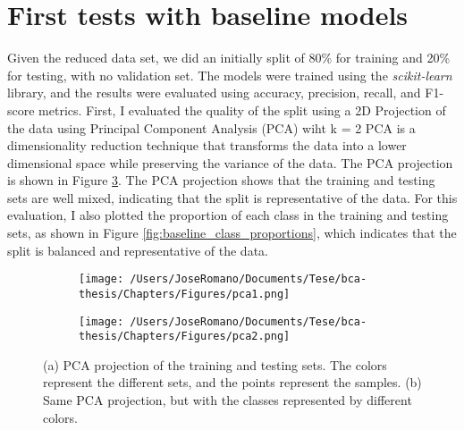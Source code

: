 \section{First tests with baseline models}

Given the reduced data set, we did an initially split of 80\% for training and
20\% for testing, with no validation set. The models were trained using the
\textit{scikit-learn} library, and the results were evaluated using accuracy,
precision, recall, and F1-score metrics. First, I evaluated the quality of the
split using a 2D Projection of the data using Principal Component Analysis
(PCA) wiht k = 2 PCA is a dimensionality reduction technique that transforms
the data into a lower dimensional space while preserving the variance of the
data. The PCA projection is shown in Figure \ref{fig:side_by_side_pca}. The PCA
projection shows that the training and testing sets are well mixed, indicating
that the split is representative of the data. For this evaluation, I also
plotted the proportion of each class in the training and testing sets, as shown
in Figure \ref{fig:baseline_class_proportions}, which indicates that the split
is balanced and representative of the data.

\begin{figure}[ht]
  \centering
  \begin{subfigure}[t]{0.48\textwidth}
    \centering
    \texttt{[image: /Users/JoseRomano/Documents/Tese/bca-thesis/Chapters/Figures/pca1.png]}
    \caption{}
    \label{fig:baseline_pca_projection1}
  \end{subfigure}
  \hfill
  \begin{subfigure}[t]{0.48\textwidth}
    \centering
    \texttt{[image: /Users/JoseRomano/Documents/Tese/bca-thesis/Chapters/Figures/pca2.png]} %
    \caption{}
    \label{fig:baseline_pca_projection2}
  \end{subfigure}
  \caption{(a) PCA projection of the training and testing sets. The colors represent the different sets, and the points represent the samples. (b) Same PCA projection, but with the classes represented by different colors.}
  \label{fig:side_by_side_pca}
\end{figure}


